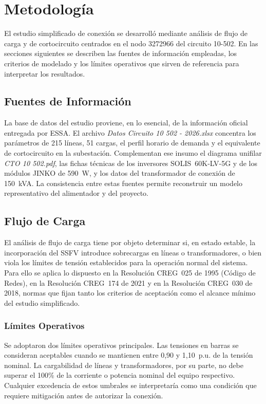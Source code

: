 \chapter{Metodología}

El estudio simplificado de conexión se desarrolló mediante análisis de flujo de carga y de cortocircuito centrados en el nodo 3272966 del circuito 10-502. En las secciones siguientes se describen las fuentes de información empleadas, los criterios de modelado y los límites operativos que sirven de referencia para interpretar los resultados.

\section{Fuentes de Información}

La base de datos del estudio proviene, en lo esencial, de la información oficial entregada por ESSA. El archivo \textit{Datos Circuito 10 502 - 2026.xlsx} concentra los parámetros de 215 líneas, 51 cargas, el perfil horario de demanda y el equivalente de cortocircuito en la subestación. Complementan ese insumo el diagrama unifilar \textit{CTO 10 502.pdf}, las fichas técnicas de los inversores SOLIS~60K-LV-5G y de los módulos JINKO de 590~W, y los datos del transformador de conexión de 150~kVA. La consistencia entre estas fuentes permite reconstruir un modelo representativo del alimentador y del proyecto.

\section{Flujo de Carga}

El análisis de flujo de carga tiene por objeto determinar si, en estado estable, la incorporación del SSFV introduce sobrecargas en líneas o transformadores, o bien viola los límites de tensión establecidos para la operación normal del sistema. Para ello se aplica lo dispuesto en la Resolución CREG~025 de 1995 (Código de Redes), en la Resolución CREG~174 de 2021 y en la Resolución CREG~030 de 2018, normas que fijan tanto los criterios de aceptación como el alcance mínimo del estudio simplificado.

\subsection{Límites Operativos}

Se adoptaron dos límites operativos principales. Las tensiones en barras se consideran aceptables cuando se mantienen entre 0,90 y 1,10~p.u. de la tensión nominal. La cargabilidad de líneas y transformadores, por su parte, no debe superar el 100\% de la corriente o potencia nominal del equipo respectivo. Cualquier excedencia de estos umbrales se interpretaría como una condición que requiere mitigación antes de autorizar la conexión.

